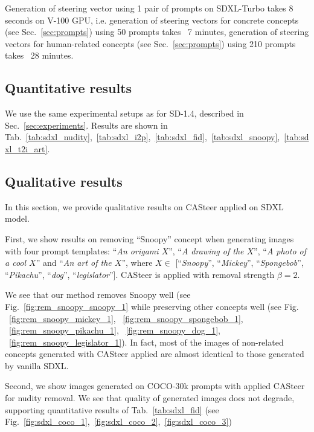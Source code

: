 Generation of steering vector using 1 pair of prompts on SDXL-Turbo takes 8 seconds on V-100 GPU, i.e. generation of steering vectors for concrete concepts (see Sec.~\ref{sec:prompts}) using 50 prompts takes ~7 minutes, generation of steering vectors for human-related concepts (see Sec.~\ref{sec:prompts}) using 210 prompts takes ~28 minutes.

\subsection{Quantitative results}

We use the same experimental setups as for SD-1.4, described in Sec.~\ref{sec:experiments}. Results are shown in Tab.~\ref{tab:sdxl_nudity},~\ref{tab:sdxl_i2p},~\ref{tab:sdxl_fid},~\ref{tab:sdxl_snoopy},~\ref{tab:sdxl_t2i_art}.









\subsection{Qualitative results}
\label{sec:sdxl_res}

In this section, we provide qualitative results on CASteer applied on SDXL model. 

First, we show results on removing ``Snoopy'' concept when generating images with four prompt templates: ``\textit{An origami $X$}'', ``\textit{A drawing of the $X$}'', ``\textit{A photo of a cool $X$}'' and ``\textit{An art of the $X$}'', where $X \in $ [``\textit{Snoopy}'', ``\textit{Mickey}'', ``\textit{Spongebob}'', ``\textit{Pikachu}'', ``\textit{dog}'', ``\textit{legislator}'']. CASteer is applied with removal strength $\beta=2$.

We see that our method removes Snoopy well (see Fig.~\ref{fig:rem_snoopy_snoopy_1} while preserving other concepts well (see Fig. ~\ref{fig:rem_snoopy_mickey_1}, ~\ref{fig:rem_snoopy_spongebob_1}, ~\ref{fig:rem_snoopy_pikachu_1},
~\ref{fig:rem_snoopy_dog_1},
~\ref{fig:rem_snoopy_legislator_1}). In fact, most of the images of non-related concepts generated with CASteer applied are almost identical to those generated by vanilla SDXL. 

Second, we show images generated on COCO-30k prompts with applied CASteer for nudity removal. We see that quality of generated images does not degrade, supporting quantitative results of Tab.~\ref{tab:sdxl_fid} (see Fig.~\ref{fig:sdxl_coco_1},~\ref{fig:sdxl_coco_2},~\ref{fig:sdxl_coco_3})

